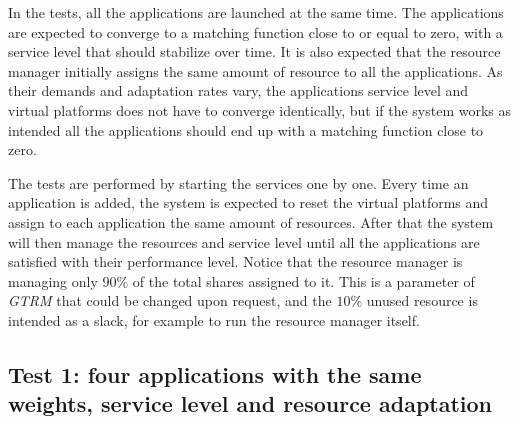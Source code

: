 \documentclass[nobiblatex]{LTHthesis}
\begin{document}
In the tests, all the applications are launched at the same time. The
applications are expected to converge to a matching function close to or
equal to zero, with a service level that should stabilize over time. It is 
also expected that the resource manager initially assigns the same amount
of resource to all the applications. As their demands and adaptation
rates vary, the applications service level and virtual platforms does not 
have to converge identically, but if the system works as intended all the
applications should end up with a matching function close to zero.

The tests are performed by starting the services one by one. Every time 
an application is added, the system is expected to reset the virtual
platforms and assign to each application the same amount of resources. 
After that the system will then manage the resources and service level 
until all the applications are satisfied with their performance level.
Notice that the resource manager is managing only $90\%$ of the total 
shares assigned to it. This is a parameter of \emph{GTRM} that could be changed
upon request, and the $10\%$ unused resource is intended as a slack, for
example to run the resource manager itself.

\subsection{Test 1: four applications with the same weights, 
  service level and resource adaptation}
\end{document}
